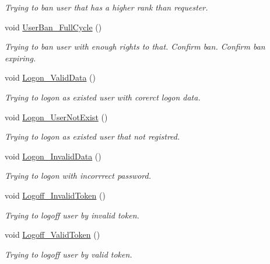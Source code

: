 \begin{DoxyCompactItemize}
\begin{DoxyCompactList}\small\item\em Trying to ban user that has a higher rank than requester. \end{DoxyCompactList}\item 
void \mbox{\hyperlink{class_a_c_tests_1_1_tests_1_1_queries_aa8ee1b6ac3d6d71f097ecbcb93200e51}{User\+Ban\+\_\+\+Full\+Cycle}} ()
\begin{DoxyCompactList}\small\item\em Trying to ban user with enough rights to that. Confirm ban. Confirm ban expiring. \end{DoxyCompactList}\item 
void \mbox{\hyperlink{class_a_c_tests_1_1_tests_1_1_queries_a6b9ffc38c78697db04cfeb7410f975a9}{Logon\+\_\+\+Valid\+Data}} ()
\begin{DoxyCompactList}\small\item\em Trying to logon as existed user with corerct logon data. \end{DoxyCompactList}\item 
void \mbox{\hyperlink{class_a_c_tests_1_1_tests_1_1_queries_a4ed3eaafcb072c911fd50ee326cb10b5}{Logon\+\_\+\+User\+Not\+Exist}} ()
\begin{DoxyCompactList}\small\item\em Trying to logon as existed user that not registred. \end{DoxyCompactList}\item 
void \mbox{\hyperlink{class_a_c_tests_1_1_tests_1_1_queries_aa4bfb0aea32100208caecb44043185bd}{Logon\+\_\+\+Invalid\+Data}} ()
\begin{DoxyCompactList}\small\item\em Trying to logon with incorrrect password. \end{DoxyCompactList}\item 
void \mbox{\hyperlink{class_a_c_tests_1_1_tests_1_1_queries_a4681bb158c5e25c0b525a5b99a3c6a2a}{Logoff\+\_\+\+Invalid\+Token}} ()
\begin{DoxyCompactList}\small\item\em Trying to logoff user by invalid token. \end{DoxyCompactList}\item 
void \mbox{\hyperlink{class_a_c_tests_1_1_tests_1_1_queries_a81874bda95bc7ff65fa636966a877e51}{Logoff\+\_\+\+Valid\+Token}} ()
\begin{DoxyCompactList}\small\item\em Trying to logoff user by valid token. \end{DoxyCompactList}\item 

\end{DoxyCompactItemize}
